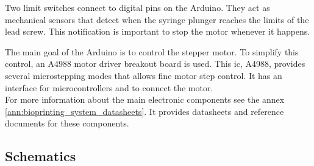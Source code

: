 Two limit switches connect to digital pins on the Arduino. They act as mechanical sensors that detect when the syringe plunger reaches the limits of the lead screw. This notification is important to stop the motor whenever it happens.

The main goal of the Arduino is to control the stepper motor. To simplify this control, an A4988 motor driver breakout board is used. This \gls{ic}, A4988, provides several microstepping modes that allows fine motor step control. It has an interface for microcontrollers and to connect the motor.\\

For more information about the main electronic components see the annex \ref{ann:bioprinting_system_datasheets}. It provides datasheets and reference documents for these components.

\begin{table}[htbp]
\end{table}


\subsection{Schematics}
\label{subsec:bioprinting_system_electronics_design_schematics}

